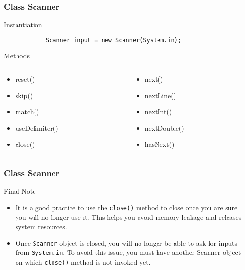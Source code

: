 \documentclass[10pt, compress]{beamer}
\begin{document}
\begin{frame}[fragile]
	\frametitle{Class Scanner}
	\begin{block}{Instantiation}
		\begin{verbatim}
			Scanner input = new Scanner(System.in);
		\end{verbatim}
	\end{block}
	\begin{block}{Methods}
		\begin{columns}
			\begin{column}{0.5\textwidth}
				\begin{itemize}
					\item[] reset()
					\item[] skip()
					\item[] match()
					\item[] useDelimiter()
					\item[] close()
				\end{itemize}
			\end{column}
			\begin{column}{0.5\textwidth}
				\begin{itemize}
					\item[] next()
					\item[] nextLine()
					\item[] nextInt()
					\item[] nextDouble()
					\item[] hasNext()
				\end{itemize}
			\end{column}
		\end{columns}
	\end{block}
\end{frame}

\begin{frame}[fragile]
	\frametitle{Class Scanner}
	\begin{block}{Final Note}
		\begin{itemize}
			\item[] It is a good practice to use the \texttt{close()} method to close once you are sure you will no longer use it. This helps you avoid memory leakage and releases system resources.
			\item[] Once \texttt{Scanner} object is closed, you will no longer be able to ask for inputs from \texttt{System.in}. To avoid this issue, you must have another Scanner object on which \texttt{close()} method is not invoked yet.
		\end{itemize}
	\end{block}
\end{frame}

\end{document}
